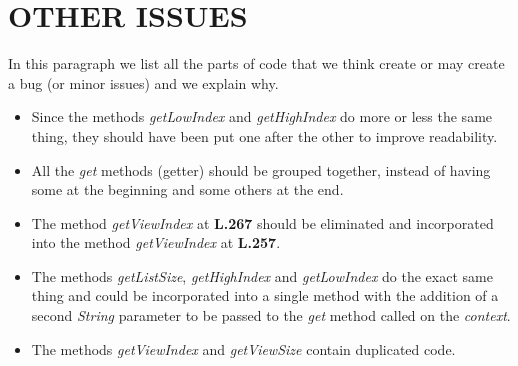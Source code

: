 \section{OTHER ISSUES}
In this paragraph we list all the parts of code that we think create or may create a bug (or minor issues) and we explain why.

\begin{itemize}
	\item Since the methods \textit{getLowIndex} and \textit{getHighIndex} do more or less the same thing, they should have been put one after the other to improve readability. 
	\item All the \textit{get} methods (getter) should be grouped together, instead of having some at the beginning and some others at the end.
	\item The method \textit{getViewIndex} at \textbf{L.267} should be eliminated and incorporated into the method \textit{getViewIndex} at \textbf{L.257}.
	\item The methods \textit{getListSize}, \textit{getHighIndex} and \textit{getLowIndex} do the exact same thing and could be incorporated into a single method with the addition of a second \textit{String} parameter to be passed to the \textit{get} method called on the \textit{context}.
	\item The methods \textit{getViewIndex} and \textit{getViewSize} contain duplicated code.
\end{itemize} 